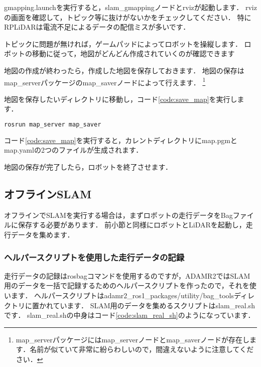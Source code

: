 \documentclass[{../../master}]{subfiles}
\begin{document}
\textsf{gmapping.launch}を実行すると，\textsf{slam\_gmapping}ノードと\textsf{rviz}が起動します．
\textsf{rviz}の画面を確認して，トピック等に抜けがないかをチェックしてください．
特にRPLiDARは電流不足によるデータの配信ミスが多いです．

トピックに問題が無ければ，ゲームパッドによってロボットを操縦します．
ロボットの移動に従って，地図がどんどん作成されていくのが確認できます

地図の作成が終わったら，作成した地図を保存しておきます．
地図の保存は\textsf{map\_server}パッケージの\textsf{map\_saver}ノードによって行えます．
\footnote{\textsf{map\_server}パッケージには\textsf{map\_server}ノードと\textsf{map\_saver}ノードが存在します．名前が似ていて非常に紛らわしいので，間違えないように注意してください．}

地図を保存したいディレクトリに移動し，コード\ref{code:save_map}を実行します．

\begin{lstlisting}[language=sh, label=code:save_map, caption=Save Map]
rosrun map_server map_saver
\end{lstlisting}

コード\ref{code:save_map}を実行すると，カレントディレクトリに\textsf{map.pgm}と\textsf{map.yaml}の2つのファイルが生成されます．

地図の保存が完了したら，ロボットを終了させます．

\subsection{オフラインSLAM}

オフラインでSLAMを実行する場合は，まずロボットの走行データをBagファイルに保存する必要があります．
前小節と同様にロボットとLiDARを起動し，走行データを集めます．

\subsubsection{ヘルパースクリプトを使用した走行データの記録}

走行データの記録は\textsf{rosbag}コマンドを使用するのですが，ADAMR2ではSLAM用のデータを一括で記録するためのヘルパースクリプトを作ったので，それを使います．
ヘルパースクリプトは\textsf{adamr2\_ros1\_packages/utility/bag\_tools}ディレクトリに置かれています．
SLAM用のデータを集めるスクリプトは\textsf{slam\_real.sh}です．
\textsf{slam\_real.sh}の中身はコード\ref{code:slam_real_sh}のようになっています．
\end{document}
